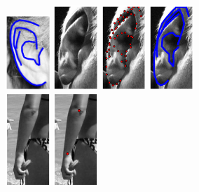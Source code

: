 \begin{figure}[ht]
    \hfill
    \includegraphics[width=0.15\textwidth]{resources/Annotation_Correction/Fig_Intro/intro_1_2}
    \hfill
    \includegraphics[width=0.15\textwidth]{resources/Annotation_Correction/Fig_Intro/intro_1_3}
    \hfill
    \includegraphics[width=0.15\textwidth]{resources/Annotation_Correction/Fig_Intro/intro_1_4}
    \hfill
    \includegraphics[width=0.15\textwidth]{resources/Annotation_Correction/Fig_Intro/intro_1_5}
    \\
    \includegraphics[width=0.15\textwidth]{resources/Annotation_Correction/Fig_Intro/intro_2_0}
    \hfill
    \includegraphics[width=0.15\textwidth]{resources/Annotation_Correction/Fig_Intro/intro_2_1}

\end{figure}
